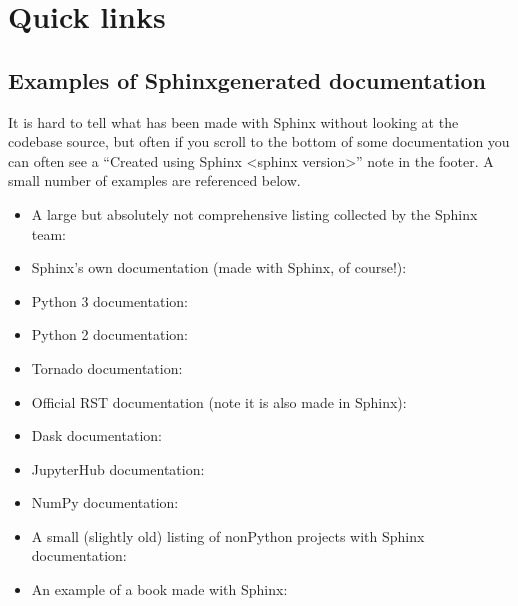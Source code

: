 \documentclass[letterpaper,10pt,english]{sphinxmanual}
\begin{document}
\section{Quick links}
\label{\detokenize{context:quick-links}}

\subsection{Examples of Sphinx\sphinxhyphen{}generated documentation}
\label{\detokenize{context:examples-of-sphinx-generated-documentation}}
It is hard to tell what has been made with Sphinx without looking at the
codebase source, but often if you scroll to the bottom of some
documentation you can often see a “Created using Sphinx \textless{}sphinx version\textgreater{}”
note in the footer. A small number of examples are referenced below.
\begin{itemize}
\item {} 
A large but absolutely not comprehensive listing collected by the Sphinx
team: 

\item {} 
Sphinx’s own documentation (made with Sphinx, of course!):

\item {} 
Python 3 documentation: 

\item {} 
Python 2 documentation: 

\item {} 
Tornado documentation: 

\item {} 
Official RST documentation (note it is also made in Sphinx):

\item {} 
Dask documentation: 

\item {} 
JupyterHub documentation: 

\item {} 
NumPy documentation: 

\item {} 
A small (slightly old) listing of non\sphinxhyphen{}Python projects with Sphinx
documentation:

\item {} 
An example of a book made with Sphinx: 

\end{itemize}
\end{document}
